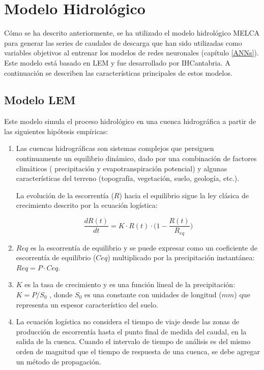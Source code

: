 \chapter{Modelo Hidrológico}
\label{Modelo_Hidrológico}

Cómo se ha descrito anteriormente, se ha utilizado el modelo hidrológico MELCA
 para generar las series de caudales de descarga que han sido utilizadas como variables objetivos
al entrenar los modelos de redes neuronales (capítulo \ref{ANNs}). 
 Este modelo está basado en LEM y fue desarrollado por IHCantabria.
 A continuación se describen las características principales de estos modelos.

\section{Modelo LEM}

Este modelo simula el proceso hidrológico en una cuenca hidrográfica a partir de las siguientes hipótesis empíricas:
\begin{enumerate}
    \item Las cuencas hidrográficas son sistemas complejos que persiguen continuamente un equilibrio dinámico, 
    dado por una combinación de factores climáticos ( precipitación y evapotranspiración potencial) 
    y algunas características del terreno (topografía, vegetación, suelo, geología, etc.). 

    La evolución de la escorrentía ($R$) hacia el equilibrio sigue la ley clásica de crecimiento descrito por la 
    ecuación logística:

    \begin{equation}
        \frac{d R(t)}{dt}=K\cdot R(t)\cdot\big(1-\frac{R(t)}{R_{eq}}\big)
    \label{eq.log}
    \end{equation}

    \item  $Req$ es la escorrentía de equilibrio  y se puede expresar como un coeficiente de escorrentía de 
    equilibrio ($Ceq$) multiplicado por la precipitación instantánea: $Req = P \cdot Ceq$. 
    
    \item $K$ es la tasa de crecimiento y es una función lineal de la precipitación: $K=P/S_0$ , donde $S_0$ 
    es una constante con unidades de longitud ($mm$) que representa un espesor característico del suelo.
    \item La ecuación logística no considera el  tiempo de viaje desde las 
    zonas de producción de escorrentía hasta el punto final de medida del caudal, en la salida de la cuenca. 
    Cuando el intervalo de tiempo de análisis es del mismo orden de magnitud que el tiempo 
    de respuesta de una cuenca, se debe agregar un método de propagación.


\end{enumerate}

